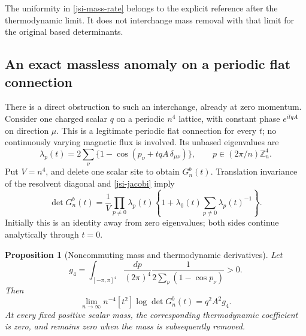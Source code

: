 \documentclass[11pt]{article}
\newtheorem{proposition}[theorem]{Proposition}
\theoremstyle{remark}
\begin{document}
The uniformity in \eqref{jsi-mass-rate} belongs to the explicit
reference after the thermodynamic limit. It does not interchange
mass removal with that limit for the original based determinants.

\subsection{An exact massless anomaly on a periodic flat connection}
\label{jsi-anomaly-section}

There is a direct obstruction to such an interchange, already
at zero momentum. Consider one charged scalar \(q\) on a periodic
\(n^4\) lattice, with constant phase \(e^{itqA}\) on direction
\(\mu\). This is a legitimate periodic flat connection for every
\(t\); no continuously varying magnetic flux is involved.
Its unbased eigenvalues are
\begin{equation}
 \lambda_p(t)=2\sum_\nu
       \{1-\cos(p_\nu+tqA\,\delta_{\mu\nu})\},
       \qquad p\in(2\pi/n)\mathbb Z_n^4.
 \label{jsi-spectrum}
\end{equation}
Put \(V=n^4\), and delete one scalar site to obtain \(G_n^b(t)\).
Translation invariance of the resolvent diagonal and
\eqref{jsi-jacobi} imply
\begin{equation}
 \det G_n^b(t)=\frac1V\prod_{p\ne0}\lambda_p(t)
       \left\{1+\lambda_0(t)
                    \sum_{p\ne0}\lambda_p(t)^{-1}\right\}.
 \label{jsi-cofactor}
\end{equation}
Initially this is an identity away from zero eigenvalues;
both sides continue analytically through \(t=0\).

\begin{proposition}[Noncommuting mass and thermodynamic derivatives]
\label{jsi-anomaly-theorem}
Let
\begin{equation}
 g_4=\int_{[-\pi,\pi]^4}\frac{dp}{(2\pi)^4}
             \frac1{2\sum_\nu(1-\cos p_\nu)}>0.
 \label{jsi-green}
\end{equation}
Then
\begin{equation}
 \lim_{n\to\infty}n^{-4}[t^2]\log\det G_n^b(t)
                           =q^2A^2g_4.
 \label{jsi-anomaly}
\end{equation}
At every fixed positive scalar mass, the corresponding
thermodynamic coefficient is zero, and remains zero when
the mass is subsequently removed.
\end{proposition}
\end{document}
